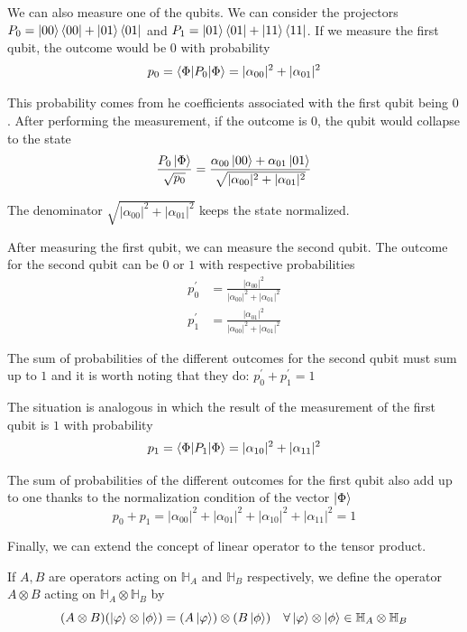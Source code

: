 \begin{ejemplo}
    We can also measure one of the qubits. We can consider the projectors $P_0 =\ket{00}\bra{00}+\ket{01}\bra{01}$ and $P_1=\ket{01}\bra{01}+\ket{11}\bra{11}$. If we measure the first qubit, the outcome would be $0$ with probability 
    $$p_0=\braket{\Phi | P_0 | \Phi} = |\alpha_{00}|^2 + |\alpha_{01}|^2$$
    
    This probability comes from he coefficients associated with the first qubit being $0$. After performing the measurement, if the outcome is $0$, the qubit would collapse to the state 
    $$\frac{P_0 \ket{\Phi}}{\sqrt{p_0}} = \frac{\alpha_{00}\ket{00} + \alpha_{01}\ket{01}}{\sqrt{|\alpha_{00}|^2 +|\alpha_{01}|^2}}$$

    The denominator $\sqrt{|\alpha_{00}|^2 +|\alpha_{01}|^2}$ keeps the state normalized. 

    After measuring the first qubit, we can measure the second qubit. The outcome for the second qubit can be $0$ or $1$ with respective probabilities
    \begin{align}
        p_0^{\prime}&=\frac{|\alpha_{00}|^2}{|\alpha_{00}|^2 +|\alpha_{01}|^2} \\
        p_1^{\prime}&= \frac{|\alpha_{01}|^2}{|\alpha_{00}|^2 +|\alpha_{01}|^2}
    \end{align}

    The sum of probabilities of the different outcomes for the second qubit must sum up to $1$ and it is worth noting that they do: $p_0^\prime + p_1^\prime =1$

    The situation is analogous in which the result of the measurement of the first qubit is $1$ with probability 
    $$p_1=\braket{\Phi | P_1 | \Phi} = |\alpha_{10}|^2 + |\alpha_{11}|^2$$

    The sum of probabilities of the different outcomes for the first qubit also add up to one thanks to the normalization condition of the vector $\ket{\Phi}$
    $$p_0+p_1=|\alpha_{00}|^2+ |\alpha_{01}|^2+ |\alpha_{10}|^2+ |\alpha_{11}|^2 = 1$$
\end{ejemplo}
\medskip
Finally, we can extend the concept of linear operator to the tensor product. 

If $A, B$ are operators acting on $\mathbb{H}_A$ and $\mathbb{H}_B$ respectively, we define the operator $A \otimes B$ acting on $\mathbb{H}_A \otimes \mathbb{H}_B$ by
$$(A \otimes B)(\ket{\varphi} \otimes \ket{\phi}) = (A\ket{\varphi}) \otimes (B\ket{\phi}) \quad \forall \ket{\varphi} \otimes \ket{\phi} \in \mathbb{H}_A \otimes \mathbb{H}_B$$

